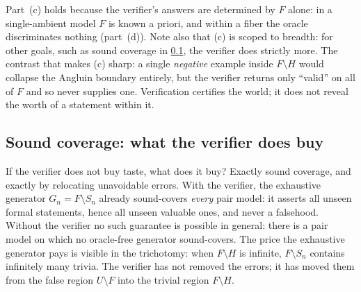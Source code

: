 \documentclass[11pt]{article}
\numberwithin{equation}{section}
\newcommand{\gnd}{U}
\newcommand{\Amb}{F}
\newcommand{\Val}{H}
\newcommand{\Seen}{S}
\theoremstyle{plain}
\theoremstyle{definition}
\theoremstyle{remark}
\begin{document}
Part~(c) holds because the verifier's answers are determined by $\Amb$ alone: in a
single-ambient model $\Amb$ is known a priori, and within a fiber the oracle discriminates
nothing (part~(d)). Note also that (c) is scoped to breadth: for other goals, such as sound
coverage in \cref{sec:res-flood}, the verifier does strictly more. The contrast that makes (c)
sharp: a single \emph{negative} example inside $\Amb \setminus \Val$ would collapse the
Angluin boundary entirely, but the verifier returns only ``valid'' on all of $\Amb$ and so
never supplies one. Verification certifies the world; it does not reveal the worth of a
statement within it.

\subsection{Sound coverage: what the verifier does buy}
\label{sec:res-flood}

If the verifier does not buy taste, what does it buy? Exactly sound coverage, and exactly by
relocating unavoidable errors. With the verifier, the exhaustive generator $G_n = \Amb
\setminus \Seen_n$ already sound-covers \emph{every} pair model: it asserts all unseen formal
statements, hence all unseen valuable ones, and never a falsehood. Without the verifier no
such guarantee is possible in general: there is a pair model on which no oracle-free generator
sound-covers. The price the exhaustive generator pays is visible in the trichotomy: when $\Amb
\setminus \Val$ is infinite, $\Amb \setminus \Seen_n$ contains infinitely many trivia. The
verifier has not removed the errors; it has moved them from the false region $\gnd \setminus
\Amb$ into the trivial region $\Amb \setminus \Val$.

\begin{figure}[omitted: a diagram of this paper's results, not reproduced here]\label{fig:sandwich}\end{figure}
\end{document}
